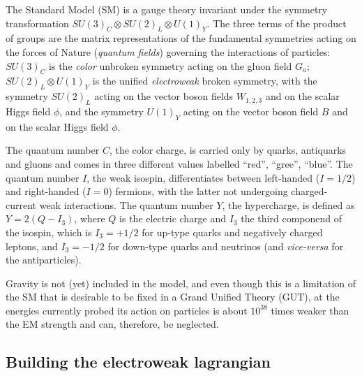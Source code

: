 The Standard Model (SM) is a gauge theory invariant under the symmetry 
transformation $SU(3)_{C} \otimes SU(2)_{L} \otimes U(1)_{Y}$. The
three terms of the product of groups are the matrix representations
of the fundamental symmetries acting on the forces of Nature ({\it quantum fields})
governing the interactions of particles: 
$SU(3)_{C}$ is the {\it color} unbroken 
symmetry %
 acting on the gluon field $G_a$; 
$SU(2)_{L} \otimes U(1)_{Y}$ is the unified {\it electroweak} broken 
symmetry, %
with the symmetry $SU(2)_{L}$
acting on the vector boson fields $W_{1,2,3}$ and on the scalar Higgs field $\phi$,
and the symmetry $U(1)_{Y}$ %
acting on the vector boson field $B$ and on the scalar Higgs field $\phi$.

The quantum number $C$, the color charge, is carried only by
quarks, antiquarks and gluons 
and comes in three different values labelled ``red'', ``gree'', ``blue''.
The quantum number $I$, the weak isospin, differentiates between left-handed
($I=1/2$) and right-handed ($I=0$) fermions, with the latter 
not undergoing charged-current weak interactions.
The quantum number $Y$, the hypercharge, is defined as $Y=2(Q-I_3)$, 
where $Q$ is the electric charge and $I_3$ the third componend of the isospin,
which is $I_3=+1/2$ for up-type quarks and negatively charged leptons, and
 $I_3=-1/2$ for down-type quarks and neutrinos (and {\it vice-versa} for the antiparticles).


Gravity is not (yet) included in the model, and even though
this is a limitation of the SM that is desirable to be fixed in a 
Grand Unified Theory (GUT), at the energies currently probed
its action on particles is about $10^{38}$ times weaker than
the EM strength
and can, therefore, be neglected.


\subsection{Building the electroweak lagrangian}\label{sec:ewlagr}

